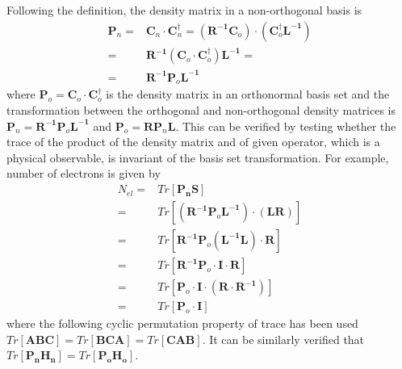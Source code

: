 \documentclass[journal=jctcce,manuscript=article,etalmode=truncate,maxauthors=10,layout=twocolumn,9pt]{achemso}   %
\begin{document}
Following the definition,  the  density matrix in a non-orthogonal basis is   
\begin{align}
\nonumber
\mathbf P_n  =&  \mathbf{ C}_n \cdot \mathbf{ C}_n^\dag=  
( \mathbf{R^{-1} C}_o ) \cdot ( \mathbf{ C}_o^\dag  \mathbf{L^{-1} }) \\
\nonumber  =&     
 \mathbf{R^{-1}} (\mathbf{ C}_o  \cdot  \mathbf{ C}_o^\dag ) \mathbf{L^{-1} }=  \\
  =&  \mathbf{R^{-1}}  \mathbf{ P}_o  \mathbf{L^{-1}} 
\end{align}
where 
 $\mathbf P_o =  \mathbf{ C}_o \cdot \mathbf{ C}_o^\dag$  is the density matrix in an orthonormal basis set  and  the
transformation between the orthogonal and non-orthogonal density  matrices is 
$\mathbf P_n  =  \mathbf{R^{-1}}  \mathbf{ P}_o  \mathbf{L^{-1}}$ and
$\mathbf P_o  =  \mathbf{R}  \mathbf{ P}_n  \mathbf{L}$.
This can be verified by  testing  whether  the trace of the product of the density matrix and of given operator, which is a physical observable,  is invariant  of the  basis set
transformation.  For example, number of electrons is given  by 
\begin{align}
\nonumber
N_{el} =& Tr[ \mathbf{P_n S}]   \\
\nonumber    =&   Tr[ ( \mathbf{R^{-1}}  \mathbf{ P}_o  \mathbf{L^{-1}} )\cdot(\mathbf{L R} )  ]  \\
\nonumber    =&   Tr[ \mathbf{R^{-1}}   \mathbf{ P}_o (  \mathbf{L^{-1} L } )\cdot\mathbf{ R}  ]   \\
\nonumber    =&   Tr[   \mathbf{R^{-1}}   \mathbf{ P}_o   \cdot \mathbf{ I} \cdot \mathbf{ R}  ]   \\
\nonumber    =&   Tr[   \mathbf{ P}_o   \cdot   \mathbf{ I } \cdot ( \mathbf{R \cdot R^{-1}}) ]  \\
    =&  Tr[   \mathbf{ P}_o   \cdot   \mathbf{ I } ]    
\end{align}
where  the following cyclic permutation  property of trace has been used 
$Tr[\mathbf{ABC}] = Tr[\mathbf{BCA}]= Tr[\mathbf{CAB}]$.
It can be similarly verified  that $Tr[ \mathbf{P_n H_n}] = Tr[ \mathbf{P_o H_o}]$.
\end{document}
